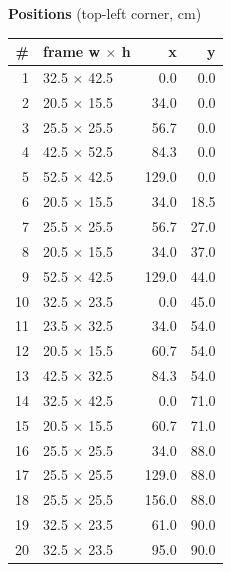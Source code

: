 \documentclass[a4paper,landscape,10pt]{article}
\begin{document}
\begin{minipage}[t]{0.25\textwidth}
\vspace{8pt}
{\bfseries Positions} (top-left corner, cm)\\[2pt]
\tiny
\begin{tabular}{@{}r l r r@{}}
\toprule
\# & frame w $\times$ h & x & y \\
\midrule
1 & 32.5 $\times$ 42.5 & 0.0 & 0.0 \\
2 & 20.5 $\times$ 15.5 & 34.0 & 0.0 \\
3 & 25.5 $\times$ 25.5 & 56.7 & 0.0 \\
4 & 42.5 $\times$ 52.5 & 84.3 & 0.0 \\
5 & 52.5 $\times$ 42.5 & 129.0 & 0.0 \\
6 & 20.5 $\times$ 15.5 & 34.0 & 18.5 \\
7 & 25.5 $\times$ 25.5 & 56.7 & 27.0 \\
8 & 20.5 $\times$ 15.5 & 34.0 & 37.0 \\
9 & 52.5 $\times$ 42.5 & 129.0 & 44.0 \\
10 & 32.5 $\times$ 23.5 & 0.0 & 45.0 \\
11 & 23.5 $\times$ 32.5 & 34.0 & 54.0 \\
12 & 20.5 $\times$ 15.5 & 60.7 & 54.0 \\
13 & 42.5 $\times$ 32.5 & 84.3 & 54.0 \\
14 & 32.5 $\times$ 42.5 & 0.0 & 71.0 \\
15 & 20.5 $\times$ 15.5 & 60.7 & 71.0 \\
16 & 25.5 $\times$ 25.5 & 34.0 & 88.0 \\
17 & 25.5 $\times$ 25.5 & 129.0 & 88.0 \\
18 & 25.5 $\times$ 25.5 & 156.0 & 88.0 \\
19 & 32.5 $\times$ 23.5 & 61.0 & 90.0 \\
20 & 32.5 $\times$ 23.5 & 95.0 & 90.0 \\
\bottomrule
\end{tabular}
\end{minipage}
\clearpage
\end{document}
